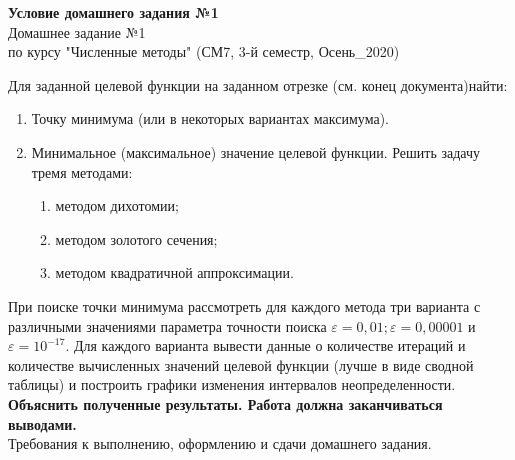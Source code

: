 \documentclass[10pt]{article}
\begin{document}
\begin{center}
\begin{large}
\textbf{Условие домашнего задания №1}\\
Домашнее задание №1\\
по курсу "Численные методы" (СМ7, 3-й семестр, Осень\_2020)\\
\end{large}
\end{center}

Для заданной целевой функции на заданном отрезке (см. конец документа)найти:
\begin{enumerate}
\item Точку минимума (или в некоторых вариантах максимума).
\item Минимальное (максимальное) значение целевой функции.
Решить задачу тремя методами:
\begin{enumerate}
\item методом дихотомии;
\item методом золотого сечения;
\item методом квадратичной аппроксимации.
\end{enumerate}
\end{enumerate}
При поиске точки минимума рассмотреть для каждого метода три варианта с различными
значениями параметра точности поиска $\varepsilon =0,01; \varepsilon=0,00001$ и $\varepsilon=10^{-17}$. Для каждого варианта
вывести данные о количестве итераций и количестве вычисленных значений целевой функции (лучше в виде сводной таблицы) и построить графики изменения интервалов неопределенности.\\
\textbf{Объяснить полученные результаты. Работа должна заканчиваться выводами.}\\
Требования к выполнению, оформлению и сдачи домашнего задания.
\end{document}
